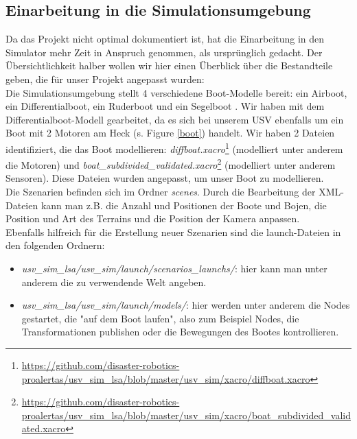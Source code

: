 \documentclass[conference]{IEEEtran}
\begin{document}
\subsection{Einarbeitung in die Simulationsumgebung}
Da das Projekt nicht optimal dokumentiert ist, hat die Einarbeitung in den Simulator mehr Zeit in Anspruch genommen, als ursprünglich gedacht. Der Übersichtlichkeit halber wollen wir hier einen Überblick über die Bestandteile geben, die für unser Projekt angepasst wurden:\\
Die Simulationsumgebung stellt 4 verschiedene Boot-Modelle bereit: ein Airboot, ein Differentialboot, ein Ruderboot und ein Segelboot \cite{b6}. Wir haben mit dem Differentialboot-Modell gearbeitet, da es sich bei unserem USV ebenfalls um ein Boot mit 2 Motoren am Heck (s. Figure \ref{boot}) handelt. Wir haben 2 Dateien identifiziert, die das Boot modellieren: \textit{diffboat.xacro}\footnote{\url{https://github.com/disaster-robotics-proalertas/usv_sim_lsa/blob/master/usv_sim/xacro/diffboat.xacro}} (modelliert unter anderem die Motoren) und \textit{boat\_subdivided\_validated.xacro}\footnote{\url{https://github.com/disaster-robotics-proalertas/usv_sim_lsa/blob/master/usv_sim/xacro/boat_subdivided_validated.xacro}} (modelliert unter anderem Sensoren). Diese Dateien wurden angepasst, um unser Boot zu modellieren.\\
Die Szenarien befinden sich im Ordner \textit{scenes}. Durch die Bearbeitung der XML-Dateien kann man z.B. die Anzahl und Positionen der Boote und Bojen, die Position und Art des Terrains und die Position der Kamera anpassen.\\
Ebenfalls hilfreich für die Erstellung neuer Szenarien sind die launch-Dateien in den folgenden Ordnern:
\begin{itemize}
	\item \textit{usv\_sim\_lsa/usv\_sim/launch/scenarios\_launchs/}: hier kann man unter anderem die zu verwendende Welt angeben.
	\item \textit{usv\_sim\_lsa/usv\_sim/launch/models/}: hier werden unter anderem die Nodes gestartet, die "auf dem Boot laufen", also zum Beispiel Nodes, die Transformationen publishen oder die Bewegungen des Bootes kontrollieren.
\end{itemize}
\end{document}
